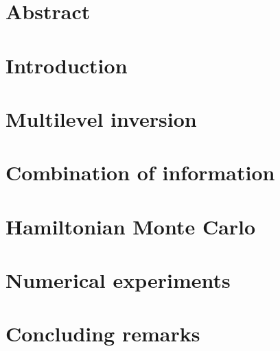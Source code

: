 \begin{refsection}

\section*{Abstract}


\section{Introduction}


\section{Multilevel inversion}


\section{Combination of information}


\section{Hamiltonian Monte Carlo}


\section{Numerical experiments}


\section{Concluding remarks}


\printbibliography[heading=subbibliography]
\end{refsection}